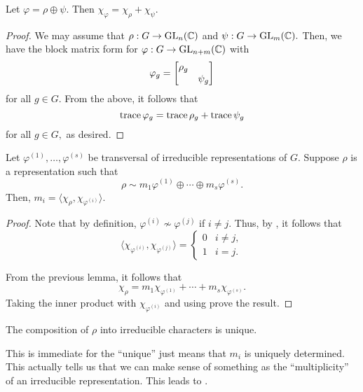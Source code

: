 \begin{lem} \label{lem:charactersadd}
	Let $\varphi = \rho \oplus \psi.$ Then $\chi_\varphi = \chi_\rho + \chi_\psi.$
\end{lem}
\begin{proof} 
	We may assume that $\rho : G \to \operatorname{GL}_n(\mathbb{C})$ and $\psi : G \to \operatorname{GL}_m(\mathbb{C}).$ Then, we have the block matrix form for $\varphi : G \to \operatorname{GL}_{n + m}(\mathbb{C})$ with
	\begin{equation*} 
		\varphi_g = \begin{bmatrix} \rho_g &  \\  & \psi_g \end{bmatrix}
	\end{equation*}
	for all $g \in G.$ From the above, it follows that
	\begin{equation*} 
		\operatorname{trace} \varphi_g = \operatorname{trace} \rho_g + \operatorname{trace} \psi_g
	\end{equation*}
	for all $g \in G,$ as desired.
\end{proof}

\begin{thm} \label{thm:innerprodwithchi}
	Let $\varphi^{(1)}, \ldots, \varphi^{(s)}$ be transversal of irreducible representations of $G.$ Suppose $\rho$ is a representation such that
	\begin{equation*} 
		\rho \sim m_1\varphi^{(1)} \oplus \cdots \oplus m_s\varphi^{(s)}.
	\end{equation*}
	Then, $m_i = \langle \chi_\rho, \chi_{\varphi^{(i)}}\rangle.$
\end{thm}
\begin{proof} 
	Note that by definition, $\varphi^{(i)} \not\sim \varphi^{(j)}$ if $i \neq j.$ Thus, by , it follows that 
	\begin{equation} \tag{$*$} \label{eq:002}
		\langle \chi_{\varphi^{(i)}}, \chi_{\varphi^{(j)}}\rangle = \begin{cases}
			0 & i \neq j,\\
			1 & i = j.
		\end{cases}
	\end{equation}

	From the previous lemma, it follows that
	\begin{equation*} 
		\chi_\rho = m_1\chi_{\varphi^{(1)}} + \cdots + m_s\chi_{\varphi^{(s)}}.
	\end{equation*}
	Taking the inner product with $\chi_{\varphi^{(i)}}$ and using  prove the result.
\end{proof}	

\begin{cor}
	The composition of $\rho$ into irreducible characters is unique.
\end{cor}
This is immediate for the ``unique'' just means that $m_i$ is uniquely determined. This actually tells us that we can make sense of something as the ``multiplicity'' of an irreducible representation. This leads to .

